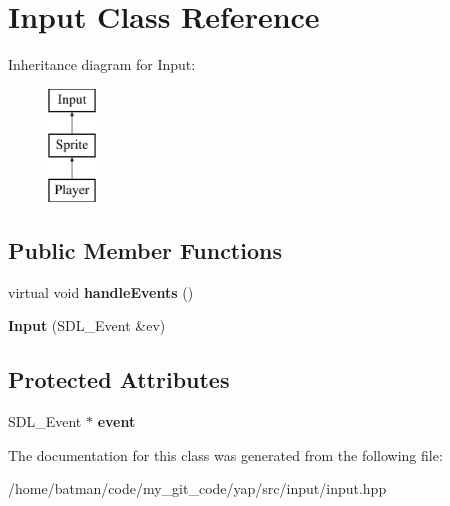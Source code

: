 \hypertarget{classInput}{}\section{Input Class Reference}
\label{classInput}
Inheritance diagram for Input\+:\begin{figure}[H]
\begin{center}
\leavevmode
\includegraphics[height=3.000000cm]{classInput}
\end{center}
\end{figure}
\subsection*{Public Member Functions}
\begin{DoxyCompactItemize}
\item 
\hypertarget{classInput_adff580a5ada93ea9d1e95f8e7da4ba0d}{}virtual void {\bfseries handle\+Events} ()\label{classInput_adff580a5ada93ea9d1e95f8e7da4ba0d}

\item 
\hypertarget{classInput_aa05b96592a3283e2ddce503417db0bee}{}{\bfseries Input} (S\+D\+L\+\_\+\+Event \&ev)\label{classInput_aa05b96592a3283e2ddce503417db0bee}

\end{DoxyCompactItemize}
\subsection*{Protected Attributes}
\begin{DoxyCompactItemize}
\item 
\hypertarget{classInput_a0302ce5a9b184e8c4a976a31fabe738f}{}S\+D\+L\+\_\+\+Event $\ast$ {\bfseries event}\label{classInput_a0302ce5a9b184e8c4a976a31fabe738f}

\end{DoxyCompactItemize}


The documentation for this class was generated from the following file\+:\begin{DoxyCompactItemize}
\item 
/home/batman/code/my\+\_\+git\+\_\+code/yap/src/input/input.\+hpp\end{DoxyCompactItemize}
